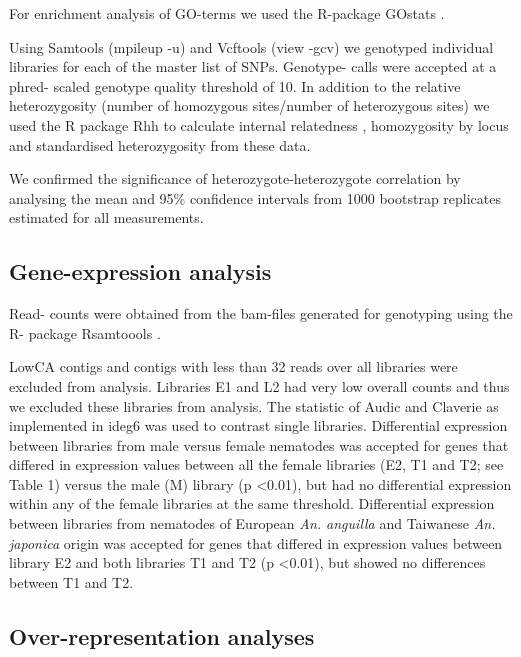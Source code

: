 \documentclass[10pt]{bmc_article}
\newenvironment{bmcformat}{\begin{raggedright}\baselineskip20pt\sloppy\setboolean{publ}{false}}{\end{raggedright}\baselineskip20pt\sloppy}
\begin{document}
\begin{bmcformat}
For enrichment analysis of GO-terms we used the R-package GOstats
\cite{pmid17098774}.

Using Samtools \cite{journals/bioinformatics/LiHWFRHMAD09} (mpileup
-u) and Vcftools \cite{pmid21653522} (view -gcv) we genotyped
individual libraries for each of the master list of SNPs. Genotype-
calls were accepted at a phred- scaled genotype quality threshold of
10. In addition to the relative heterozygosity (number of homozygous
sites/number of heterozygous sites) we used the R package Rhh
\cite{pmid21565077} to calculate internal relatedness
\cite{pmid11571049}, homozygosity by locus \cite{pmid17107491} and
standardised heterozygosity \cite{coltman81j} from these data.

We confirmed the significance of heterozygote-heterozygote correlation
by analysing the mean and 95\% confidence intervals from 1000
bootstrap replicates estimated for all measurements.

\subsection*{Gene-expression analysis}

Read- counts were obtained from the bam-files generated for genotyping
using the R- package Rsamtoools \cite{rsamtools}. 

LowCA contigs and contigs with less than 32 reads over all libraries
were excluded from analysis. Libraries E1 and L2 had very low overall
counts and thus we excluded these libraries from analysis. The
statistic of Audic and Claverie \cite{pmid9331369} as implemented in
ideg6 \cite{pmid12429865} was used to contrast single
libraries. Differential expression between libraries from male versus
female nematodes was accepted for genes that differed in expression
values between all the female libraries (E2, T1 and T2; see Table 1)
versus the male (M) library (p <0.01), but had no differential
expression within any of the female libraries at the same
threshold. Differential expression between libraries from nematodes of
European \textit{An. anguilla} and Taiwanese \textit{An. japonica}
origin was accepted for genes that differed in expression values
between library E2 and both libraries T1 and T2 (p <0.01), but showed
no differences between T1 and T2.

\subsection*{Over-representation analyses}


\end{bmcformat}
\end{document}
